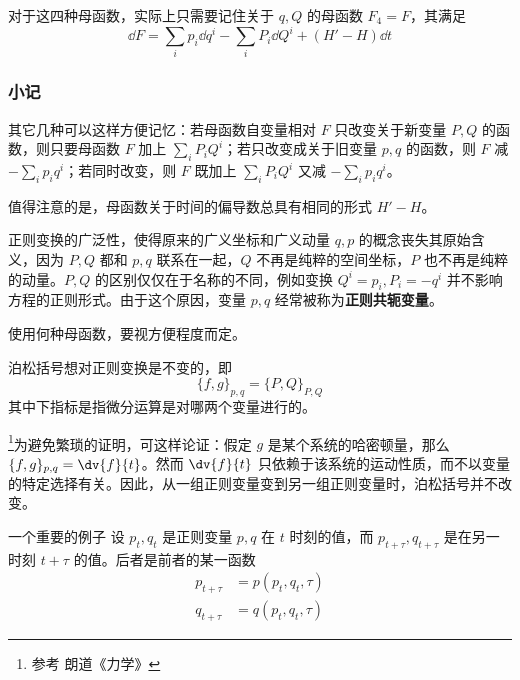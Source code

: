 对于这四种母函数，实际上只需要记住关于 $q,Q$ 的母函数 $F_4=F$，其满足
\begin{equation}
\dd F=\sum_ip_i\dd q^i-\sum_iP_i\dd Q^i+(H'-H)\dd t
\end{equation}
\subsubsection{小记}
其它几种可以这样方便记忆：若母函数自变量相对 $F$ 只改变关于新变量 $P,Q$ 的函数，则只要母函数 $F$ 加上 $\sum_iP_iQ^i$；若只改变成关于旧变量 $p,q$ 的函数，则 $F$ 减 $-\sum_ip_iq^i$；若同时改变，则 $F$ 既加上 $\sum_iP_iQ^i$ 又减 $-\sum_ip_iq^i$。

值得注意的是，母函数关于时间的偏导数总具有相同的形式 $H'-H$。

正则变换的广泛性，使得原来的广义坐标和广义动量 $q,p$ 的概念丧失其原始含义，因为 $P,Q$ 都和 $p,q$ 联系在一起，$Q$ 不再是纯粹的空间坐标，$P$ 也不再是纯粹的动量。$P,Q$ 的区别仅仅在于名称的不同，例如变换 $Q^i=p_i,P_i=-q^i$ 并不影响方程的正则形式。由于这个原因，变量 $p,q$ 经常被称为\textbf{正则共轭变量}。

使用何种母函数，要视方便程度而定。
\begin{theorem}{}
泊松括号想对正则变换是不变的，即
\begin{equation}
\{f,g\}_{p,q}=\{P,Q\}_{P,Q}
\end{equation}
其中下指标是指微分运算是对哪两个变量进行的。
\end{theorem}
\footnote{参考 朗道《力学》}为避免繁琐的证明，可这样论证：假定 $g$ 是某个系统的哈密顿量，那么 $\{f,g\}_{p,q}=\dv{f}{t}$。然而 $\dv{f}{t}$ 只依赖于该系统的运动性质，而不以变量的特定选择有关。因此，从一组正则变量变到另一组正则变量时，泊松括号并不改变。
\begin{example}{一个重要的例子}
设 $p_t,q_t$ 是正则变量 $p,q$ 在 $t$ 时刻的值，而 $p_{t+\tau},q_{t+\tau}$ 是在另一时刻 $t+\tau$ 的值。后者是前者的某一函数
\begin{equation}
\begin{aligned}
p_{t+\tau}&=p(p_t,q_t,\tau)\\
q_{t+\tau}&=q(p_t,q_t,\tau)
\end{aligned}
\end{equation}

\end{example}





